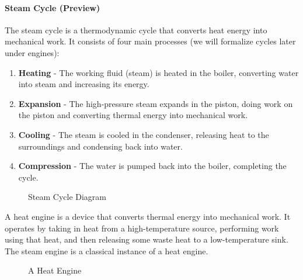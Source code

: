 \documentclass[11pt]{report}
\begin{document}
\paragraph{Steam Cycle (Preview)} The steam cycle is a thermodynamic cycle that converts heat energy into mechanical work. It consists of four main processes (we will formalize cycles later under engines): 
\begin{enumerate}
    \item \textbf{Heating} - The working fluid (steam) is heated in the boiler, converting water into steam and increasing its energy.
    \item \textbf{Expansion} - The high-pressure steam expands in the piston, doing work on the piston and converting thermal energy into mechanical work.
    \item \textbf{Cooling} - The steam is cooled in the condenser, releasing heat to the surroundings and condensing back into water.
    \item \textbf{Compression} - The water is pumped back into the boiler, completing the cycle.
\end{enumerate}

\begin{figure}[h!]
    \centering
    \caption{Steam Cycle Diagram}
\end{figure}

\begin{definition}
    A heat engine is a device that converts thermal energy into mechanical work. It operates by taking in heat from a high-temperature source, performing work using that heat, and then releasing some waste heat to a low-temperature sink. The steam engine is a classical instance of a heat engine.
\end{definition}
\begin{figure}[h!]
    \centering
    \caption{A Heat Engine}
\end{figure}
\end{document}
